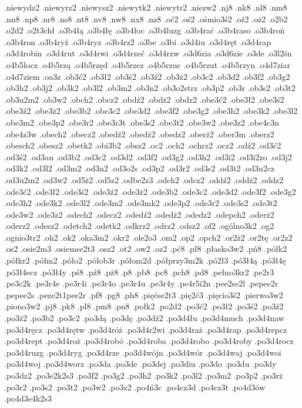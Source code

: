 {.niewydz2
.niewyrz2
.niewysz2
.niewytk2
.niewytr2
.niezw2
.nj8
.nk8
.nl8
.nm8
.nn8
.np8
.nr8
.ns8
.nt8
.nv8
.nw8
.nx8
.nz8
.oć2
.oś2
.ośmio3ś2
.oź2
.oż2
.o2b2
.o2d2
.o2t3chł
.o3b4łą
.o3b4łę
.o3b4łoc
.o3b4luzg
.o3b4rać
.o3b4raso
.o3b4roń
.o3b4ron
.o3b4ryź
.o3b4ryz
.o3b4rz2
.o3be
.o3bi
.o3d4iu
.o3d4ręt
.o3d4rap
.o3d4robin
.o3d4rut
.o3d4rwi
.o3d4rzeć
.o3d4rzw
.o3d6zia
.o3d6zie
.o3de
.o3l2śn
.o4b5łocz
.o4b5rzą
.o4b5rzęd
.o4b5rzez
.o4b5rzuc
.o4b5rzut
.o4b5rzyn
.o4d7ziar
.o4d7ziem
.oa3z
.ob3ć2
.ob3ł2
.ob3ś2
.ob3ź2
.ob3ż2
.ob3c2
.ob3d2
.ob3f2
.ob3g2
.ob3h2
.ob3j2
.ob3k2
.ob3l2
.ob3m2
.ob3n2
.ob3o2strz
.ob3p2
.ob3r
.ob3s2
.ob3t2
.ob3u2m2
.ob3w2
.obch2
.obcz2
.obdź2
.obdż2
.obdz2
.obe3ć2
.obe3ł2
.obe3ś2
.obe3ź2
.obe3ż2
.obe3b2
.obe3c2
.obe3d2
.obe3f2
.obe3g2
.obe3h2
.obe3k2
.obe3l2
.obe3m2
.obe3p2
.obe3r2
.obe3r3t
.obe3s2
.obe3t2
.obe3w2
.obe3z2
.obe4c3n
.obe4z3w
.obech2
.obecz2
.obedź2
.obedż2
.obedz2
.oberż2
.ober3m
.oberz2
.obesch2
.obesz2
.obetk2
.obi3b2
.obsz2
.oc2
.och2
.ochrz2
.ocz2
.odź2
.od3ć2
.od3ś2
.od3au
.od3b2
.od3c2
.od3d2
.od3f2
.od3g2
.od3h2
.od3i2
.od3i2zo
.od3j2
.od3k2
.od3l2
.od3m2
.od3n2
.od3o2s
.od3p2
.od3r2
.od3s2
.od3t2
.od3u2cz
.od3u2m2
.od3w2
.od5ż2
.od5z2
.odbe2z3
.odch2
.odcz2
.oddź2
.oddż2
.oddz2
.ode3ć2
.ode3ł2
.ode3ś2
.ode3ź2
.ode3ż2
.ode3b2
.ode3c2
.ode3d2
.ode3f2
.ode3g2
.ode3h2
.ode3k2
.ode3l2
.ode3m2
.ode3mk2
.ode3p2
.ode3r2
.ode3s2
.ode3t2
.ode3w2
.ode3z2
.odech2
.odecz2
.odedź2
.odedż2
.odedz2
.odepch2
.oderż2
.oderz2
.odesz2
.odetch2
.odetk2
.odkrz2
.odrz2
.odsz2
.of2
.ogólno3k2
.og2
.ognio3tr2
.oh2
.ok2
.oka3m2
.okr2
.ole2o3
.om2
.op2
.opch2
.or2ż2
.or2tę
.or2z2
.os2
.osie2m3
.osiemse2t3
.osz2
.ot2
.ow2
.oz2
.pć8
.pł8
.płasko3w2
.pń8
.półk2
.półkr2
.półm2
.póło2
.półob3r
.półom2d
.półprzy3m2k
.pó2ł3
.pó3ł4ą
.pó3ł4ę
.pó3ł4ecz
.pó3ł4y
.pś8
.pź8
.pż8
.p8
.pb8
.pc8
.pch8
.pd8
.pełno3kr2
.pe2r3
.pe3c2k
.pe3r4e
.pe3r4i
.pe3r4o
.pe3r4u
.pe3r4y
.pe4r5i2n
.pee2se2l
.pepee2r
.pepee2s
.peze2t1pee2r
.pf8
.pg8
.ph8
.pięćse2t3
.pię2ć3
.pięcio3ś2
.pierwo3w2
.piono3w2
.pj8
.pk8
.pl8
.pm8
.pn8
.połk2
.po2d2
.po3ć2
.po3ł2
.po3ś2
.po3ź2
.po3ż2
.po3b2
.po3c2
.po3dą
.po3dę
.po3dź2
.po3d4łu
.po3d4much
.po3d4naw
.po3d4ręcz
.po3d4rętw
.po3d4róż
.po3d4r2wi
.po3d4raż
.po3d4rap
.po3d4repcz
.po3d4rept
.po3d4roż
.po3d4robó
.po3d4roba
.po3d4robo
.po3d4roby
.po3d4rocz
.po3d4ruzg
.po3d4ryg
.po3d4rze
.po3d4wójn
.po3d4wór
.po3d4waj
.po3d4woi
.po3d4woj
.po3d4worz
.po3da
.po3de
.po3dej
.po3diu
.po3do
.po3du
.po3dy
.po3dz2
.po3e2k2s3
.po3f2
.po3g2
.po3h2
.po3k2
.po3l2
.po3m2
.po3p2
.po3rż
.po3r2
.po3s2
.po3t2
.po3w2
.po3z2
.po4ń3c
.po4cz3d
.po4cz3t
.po4d3ów
.po4d3e4k2s3
}
